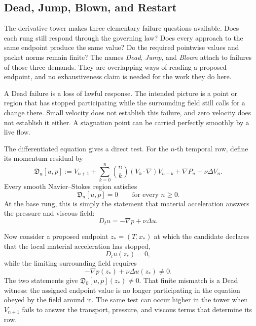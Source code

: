 \subsection{Dead, Jump, Blown, and Restart}\label{sub:DeadJumpBlownAndRestart}

The derivative tower makes three elementary failure questions available.
Does each rung still respond through the governing law?
Does every approach to the same endpoint produce the same value?
Do the required pointwise values and packet norms remain finite?
The names \emph{Dead}, \emph{Jump}, and \emph{Blown} attach to failures of those three demands.
They are overlapping ways of reading a proposed endpoint, and no exhaustiveness claim is needed for the work they do here.


A Dead failure is a loss of lawful response.
The intended picture is a point or region that has stopped participating while the surrounding field still calls for a change there.
Small velocity does not establish this failure, and zero velocity does not establish it either.
A stagnation point can be carried perfectly smoothly by a live flow.

The differentiated equation gives a direct test.
For the \(n\)-th temporal row, define its momentum residual by
\[
  \mathfrak D_n[u,p]
  :=
  V_{n+1}
  +
  \sum_{k=0}^{n}
  \binom{n}{k}
  (V_k\cdot\nabla)V_{n-k}
  +
  \nabla P_n
  -
  \nu\Delta V_n.
\]
Every smooth Navier--Stokes region satisfies
\[
  \mathfrak D_n[u,p]=0
  \qquad
  \text{for every }n\geq0.
\]
At the base rung, this is simply the statement that material acceleration answers the pressure and viscous field:
\[
  D_tu=-\nabla p+\nu\Delta u.
\]

Now consider a proposed endpoint \(z_*=(T,x_*)\) at which the candidate declares that the local material acceleration has stopped,
\[
  D_tu(z_*)=0,
\]
while the limiting surrounding field requires
\[
  -\nabla p(z_*)+\nu\Delta u(z_*)\neq0.
\]
The two statements give \(\mathfrak D_0[u,p](z_*)\neq0\).
That finite mismatch is a Dead witness: the assigned endpoint value is no longer participating in the equation obeyed by the field around it.
The same test can occur higher in the tower when \(V_{n+1}\) fails to answer the transport, pressure, and viscous terms that determine its row.

